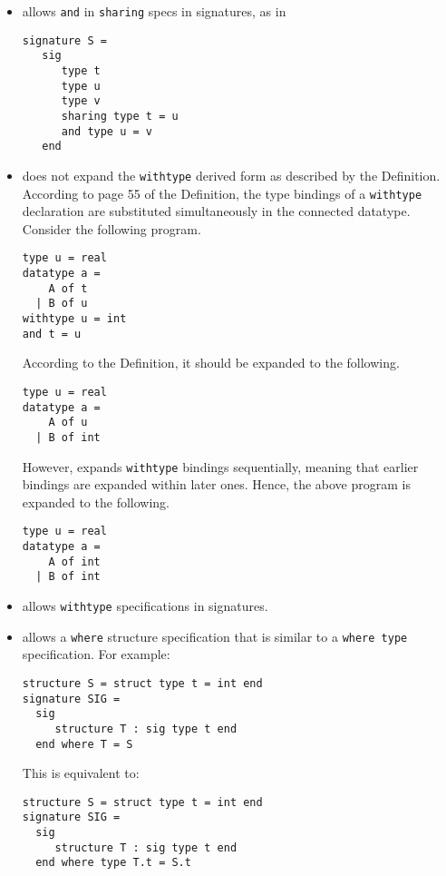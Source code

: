 \begin{itemize}
\item
{\smlnj} allows {\tt and} in {\tt sharing} specs in signatures, as in
\begin{verbatim}
signature S =
   sig
      type t
      type u
      type v
      sharing type t = u
      and type u = v
   end
\end{verbatim}
%
\item
{\smlnj} does not expand the {\tt withtype} derived form as described by
the Definition.  According to page 55 of the Definition, the type
bindings of a {\tt withtype} declaration are substituted simultaneously
in the connected datatype.  Consider the following program.
\begin{verbatim}
type u = real
datatype a =
    A of t
  | B of u
withtype u = int
and t = u
\end{verbatim}
According to the Definition, it should be expanded to the following.
\begin{verbatim}
type u = real
datatype a =
    A of u
  | B of int
\end{verbatim}
However, {\smlnj} expands {\tt withtype} bindings sequentially, meaning
that earlier bindings are expanded within later ones.  Hence, the
above program is expanded to the following.
\begin{verbatim}
type u = real
datatype a =
    A of int
  | B of int
\end{verbatim}
%
\item
{\smlnj} allows {\tt withtype} specifications in signatures.

\item
{\smlnj} allows a {\tt where} structure specification that is similar
to a {\tt where type} specification.  For example:
\begin{verbatim}
structure S = struct type t = int end
signature SIG =
  sig
     structure T : sig type t end
  end where T = S
\end{verbatim}
This is equivalent to:
\begin{verbatim}
structure S = struct type t = int end
signature SIG =
  sig
     structure T : sig type t end
  end where type T.t = S.t
\end{verbatim}

\end{itemize}
